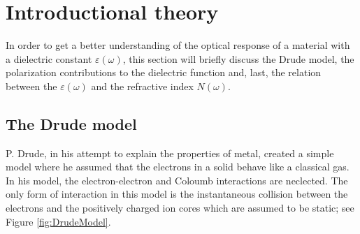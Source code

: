\section{\textbf{Introductional theory}}
In order to get a better understanding of the optical response of a material with a dielectric constant
$\varepsilon(\omega)$, this section will briefly discuss the Drude model, the polarization contributions
to the dielectric function and, last, the relation between the $\varepsilon(\omega)$ and the refractive
index $N(\omega)$.

\subsection{The Drude model}
P. Drude, in his attempt to explain the properties of metal, created a simple model where he assumed that the
electrons in a solid behave like a classical gas. In his model, the electron-electron and Coloumb interactions
are neclected. The only form of interaction in this model is the instantaneous collision between 
the electrons and the positively charged ion cores which are assumed to be static;
see Figure \ref{fig:DrudeModel}. 
%
